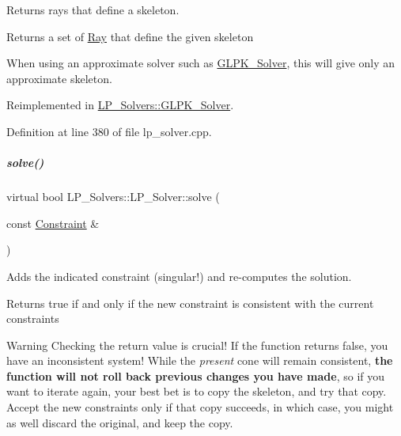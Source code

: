 Returns rays that define a skeleton. 

\begin{DoxyReturn}{Returns}
a set of \hyperlink{group___c_l_s_solvers_class_l_p___solvers_1_1_ray}{Ray} that define the given skeleton
\end{DoxyReturn}
When using an approximate solver such as \hyperlink{group___c_l_s_solvers_class_l_p___solvers_1_1_g_l_p_k___solver}{G\+L\+P\+K\+\_\+\+Solver}, this will give only an approximate skeleton. 

Reimplemented in \hyperlink{group___c_l_s_solvers_ae011960777ca5e09d8c2b24c6ff66367}{L\+P\+\_\+\+Solvers\+::\+G\+L\+P\+K\+\_\+\+Solver}.



Definition at line 380 of file lp\+\_\+solver.\+cpp.

\mbox{\label{group___c_l_s_solvers_a8b9979fb228ac9ccfe037ad6ca48b314}} 
\subparagraph{\texorpdfstring{solve()}{solve()}\hspace{0.1cm}{\footnotesize\ttfamily [1/2]}}
{\footnotesize\ttfamily virtual bool L\+P\+\_\+\+Solvers\+::\+L\+P\+\_\+\+Solver\+::solve (\begin{DoxyParamCaption}\item[{const \hyperlink{group___c_l_s_solvers_class_l_p___solvers_1_1_constraint}{Constraint} \&}]{ }\end{DoxyParamCaption})\hspace{0.3cm}{\ttfamily [pure virtual]}}



Adds the indicated constraint (singular!) and re-\/computes the solution. 

\begin{DoxyReturn}{Returns}
{\ttfamily true} if and only if the new constraint is consistent with the current constraints
\end{DoxyReturn}
\begin{DoxyWarning}{Warning}
Checking the return value is crucial! If the function returns {\ttfamily false}, you have an inconsistent system! While the {\itshape present} cone will remain consistent, {\bfseries the function will not roll back previous changes you have made}, so if you want to iterate again, your best bet is to copy the skeleton, and try that copy. Accept the new constraints only if that copy succeeds, in which case, you might as well discard the original, and keep the copy. 
\end{DoxyWarning}



